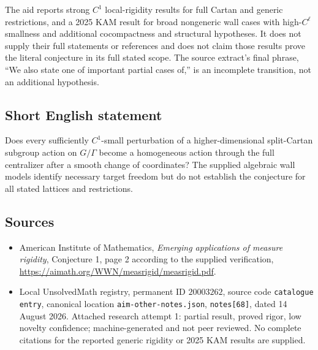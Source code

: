 \documentclass[11pt]{article}
\begin{document}
The aid reports strong $C^1$ local-rigidity results for full Cartan and generic restrictions, and a 2025 KAM result for broad nongeneric wall cases with high-$C^\ell$ smallness and additional cocompactness and structural hypotheses. It does not supply their full statements or references and does not claim those results prove the literal conjecture in its full stated scope. The source extract's final phrase, ``We also state one of important partial cases of,'' is an incomplete transition, not an additional hypothesis.
\subsection{Short English statement}
Does every sufficiently $C^1$-small perturbation of a higher-dimensional split-Cartan subgroup action on $G/\Gamma$ become a homogeneous action through the full centralizer after a smooth change of coordinates? The supplied algebraic wall models identify necessary target freedom but do not establish the conjecture for all stated lattices and restrictions.
\subsection{Sources}
\begin{itemize}
\item American Institute of Mathematics, \emph{Emerging applications of measure rigidity}, Conjecture 1, page 2 according to the supplied verification, \url{https://aimath.org/WWN/measrigid/measrigid.pdf}.
\item Local UnsolvedMath registry, permanent ID $20003262$, source code \texttt{catalogue entry}, canonical location \texttt{aim-other-notes.json}, \texttt{notes[68]}, dated 14 August 2026. Attached research attempt 1: partial result, proved rigor, low novelty confidence; machine-generated and not peer reviewed. No complete citations for the reported generic rigidity or 2025 KAM results are supplied.
\end{itemize}
\end{document}
